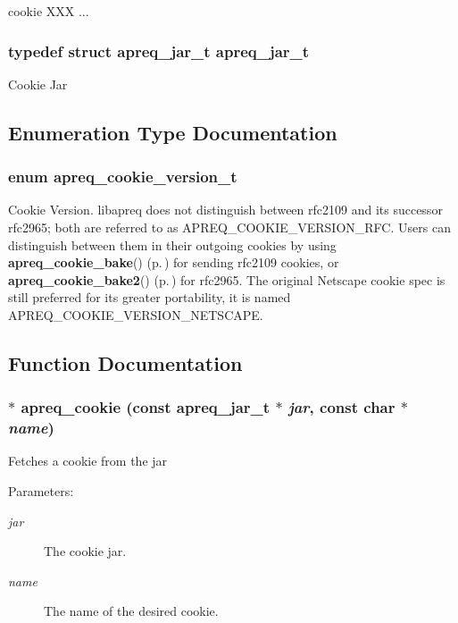 cookie XXX ... 
\subsubsection{\setlength{\rightskip}{0pt plus 5cm}typedef struct apreq\_\-jar\_\-t  apreq\_\-jar\_\-t}\label{group__cookies_a0}


Cookie Jar 

\subsection{Enumeration Type Documentation}
\subsubsection{\setlength{\rightskip}{0pt plus 5cm}enum apreq\_\-cookie\_\-version\_\-t}\label{group__cookies_a23}


Cookie Version. libapreq does not distinguish between rfc2109 and its successor rfc2965; both are referred to as APREQ\_\-COOKIE\_\-VERSION\_\-RFC. Users can distinguish between them in their outgoing cookies by using {\bf apreq\_\-cookie\_\-bake}() {\rm (p.\,\pageref{group__cookies_a10})} for sending rfc2109 cookies, or {\bf apreq\_\-cookie\_\-bake2}() {\rm (p.\,\pageref{group__cookies_a11})} for rfc2965. The original Netscape cookie spec is still preferred for its greater portability, it is named APREQ\_\-COOKIE\_\-VERSION\_\-NETSCAPE. 

\subsection{Function Documentation}
\subsubsection{$\ast$ apreq\_\-cookie (const {\bf apreq\_\-jar\_\-t} $\ast$ {\em jar}, const char $\ast$ {\em name})}\label{group__cookies_a2}


Fetches a cookie from the jar\begin{Desc}
\item[Parameters: ]\par
\begin{description}
\item[{\em 
jar}]The cookie jar. \item[{\em 
name}]The name of the desired cookie. \end{description}
\end{Desc}
